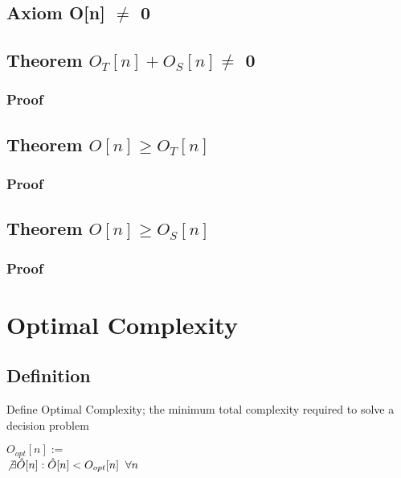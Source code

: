 \documentclass[11pt]{article}
\begin{document}
\subsection{Axiom O[n] $\neq$ 0}
\subsection{Theorem $O_T[n] + O_S[n] \neq$ 0}
\subsubsection{Proof}



\subsection{Theorem $O[n] \geq O_T[n]$}
\subsubsection{Proof}

\subsection{Theorem $O[n] \geq O_S[n]$}
\subsubsection{Proof}







\newpage
\section{Optimal Complexity}

\subsection{Definition}
Define Optimal Complexity; the minimum total complexity required to solve a decision problem
\begin{center}
$O_{opt}[n] :=$
\\ \vspace{2mm}
$\not \exists \hat{O} \lbrack n \rbrack : \hat{O} \lbrack n \rbrack < O_{opt}[n] \hspace{2mm} \forall n$
\end{center}
\end{document}
